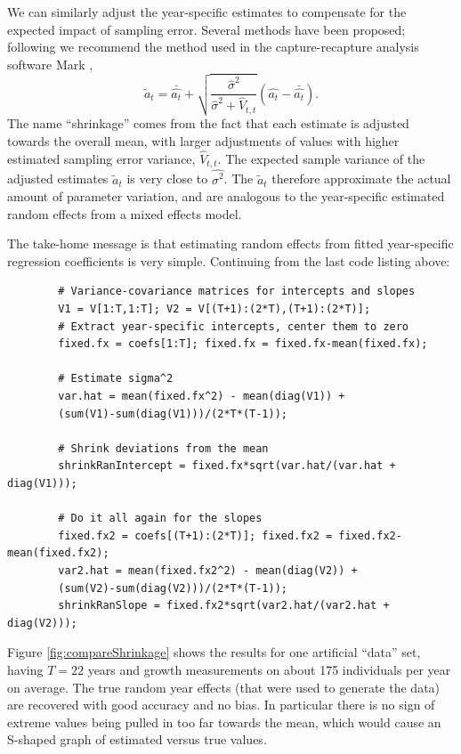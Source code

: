 \documentclass[12pt]{article}
\newcommand{\be}{\begin{equation}}
\newcommand{\ee}{\end{equation}}
\begin{document}
\begin{spacing}{1.35}
	We can similarly adjust the year-specific estimates to compensate for the expected impact of sampling error. Several methods  
	have been proposed; following \citet{metcalf-etal-2015} we recommend the method used in the 
	capture-recapture analysis software Mark \citet{cooch-white-2020}, 
	\be
	\widetilde{a}_t = \bar{\hat{a_t}} + \sqrt{\frac{\hat{\sigma}^2}{\hat{\sigma}^2 + \hat{V}_{t,t}}}\left (\hat{a_t} - \bar{\hat{a_t}} \right). 
	\label{eqn:ShrinkLess}
	\ee
	The name ``shrinkage'' comes from the fact that each estimate is adjusted towards the overall mean, with 
	larger adjustments of values with higher estimated sampling error variance, $\hat{V}_{t,t}$. 
	The expected sample variance of the adjusted estimates $\widetilde{a}_t$ is very close to $\hat{\sigma^2}$. 
	The $\widetilde{a}_t$ therefore approximate the actual amount of parameter variation, and are analogous to the 
	year-specific estimated random effects from a mixed effects model. 
	
	The take-home message is that estimating random effects from fitted year-specific regression 
	coefficients is very simple. Continuing from the last code listing above: 
	\begin{lstlisting}
		# Variance-covariance matrices for intercepts and slopes
		V1 = V[1:T,1:T]; V2 = V[(T+1):(2*T),(T+1):(2*T)]; 
		# Extract year-specific intercepts, center them to zero   
		fixed.fx = coefs[1:T]; fixed.fx = fixed.fx-mean(fixed.fx); 
		
		# Estimate sigma^2
		var.hat = mean(fixed.fx^2) - mean(diag(V1)) + 
		(sum(V1)-sum(diag(V1)))/(2*T*(T-1)); 
		
		# Shrink deviations from the mean 
		shrinkRanIntercept = fixed.fx*sqrt(var.hat/(var.hat + diag(V1)));
		
		# Do it all again for the slopes 
		fixed.fx2 = coefs[(T+1):(2*T)]; fixed.fx2 = fixed.fx2-mean(fixed.fx2); 
		var2.hat = mean(fixed.fx2^2) - mean(diag(V2)) + 
		(sum(V2)-sum(diag(V2)))/(2*T*(T-1)); 
		shrinkRanSlope = fixed.fx2*sqrt(var2.hat/(var2.hat + diag(V2))); 
	\end{lstlisting}
	
	Figure \ref{fig:compareShrinkage} shows the results for one artificial ``data'' set, having $T=22$ years and growth measurements on 
	about 175 individuals per year on average. The true random year effects (that were used to generate the data) are recovered
	with good accuracy and no bias. In particular there is no sign of extreme values being pulled in too far
	towards the mean, which would cause an S-shaped graph of estimated versus true values. 
	

\end{spacing}
\end{document}
